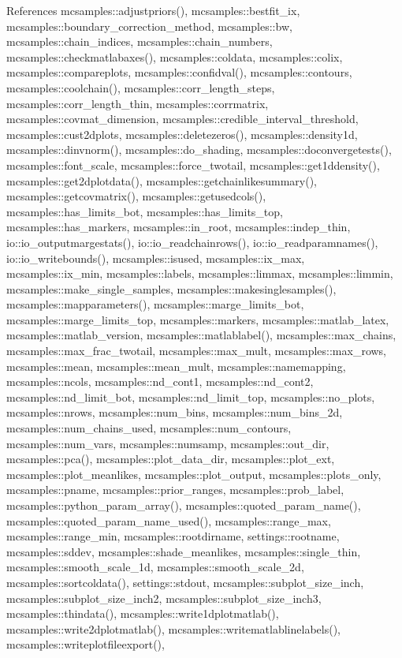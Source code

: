 References mcsamples\+::adjustpriors(), mcsamples\+::bestfit\+\_\+ix, mcsamples\+::boundary\+\_\+correction\+\_\+method, mcsamples\+::bw, mcsamples\+::chain\+\_\+indices, mcsamples\+::chain\+\_\+numbers, mcsamples\+::checkmatlabaxes(), mcsamples\+::coldata, mcsamples\+::colix, mcsamples\+::compareplots, mcsamples\+::confidval(), mcsamples\+::contours, mcsamples\+::coolchain(), mcsamples\+::corr\+\_\+length\+\_\+steps, mcsamples\+::corr\+\_\+length\+\_\+thin, mcsamples\+::corrmatrix, mcsamples\+::covmat\+\_\+dimension, mcsamples\+::credible\+\_\+interval\+\_\+threshold, mcsamples\+::cust2dplots, mcsamples\+::deletezeros(), mcsamples\+::density1d, mcsamples\+::dinvnorm(), mcsamples\+::do\+\_\+shading, mcsamples\+::doconvergetests(), mcsamples\+::font\+\_\+scale, mcsamples\+::force\+\_\+twotail, mcsamples\+::get1ddensity(), mcsamples\+::get2dplotdata(), mcsamples\+::getchainlikesummary(), mcsamples\+::getcovmatrix(), mcsamples\+::getusedcols(), mcsamples\+::has\+\_\+limits\+\_\+bot, mcsamples\+::has\+\_\+limits\+\_\+top, mcsamples\+::has\+\_\+markers, mcsamples\+::in\+\_\+root, mcsamples\+::indep\+\_\+thin, io\+::io\+\_\+outputmargestats(), io\+::io\+\_\+readchainrows(), io\+::io\+\_\+readparamnames(), io\+::io\+\_\+writebounds(), mcsamples\+::isused, mcsamples\+::ix\+\_\+max, mcsamples\+::ix\+\_\+min, mcsamples\+::labels, mcsamples\+::limmax, mcsamples\+::limmin, mcsamples\+::make\+\_\+single\+\_\+samples, mcsamples\+::makesinglesamples(), mcsamples\+::mapparameters(), mcsamples\+::marge\+\_\+limits\+\_\+bot, mcsamples\+::marge\+\_\+limits\+\_\+top, mcsamples\+::markers, mcsamples\+::matlab\+\_\+latex, mcsamples\+::matlab\+\_\+version, mcsamples\+::matlablabel(), mcsamples\+::max\+\_\+chains, mcsamples\+::max\+\_\+frac\+\_\+twotail, mcsamples\+::max\+\_\+mult, mcsamples\+::max\+\_\+rows, mcsamples\+::mean, mcsamples\+::mean\+\_\+mult, mcsamples\+::namemapping, mcsamples\+::ncols, mcsamples\+::nd\+\_\+cont1, mcsamples\+::nd\+\_\+cont2, mcsamples\+::nd\+\_\+limit\+\_\+bot, mcsamples\+::nd\+\_\+limit\+\_\+top, mcsamples\+::no\+\_\+plots, mcsamples\+::nrows, mcsamples\+::num\+\_\+bins, mcsamples\+::num\+\_\+bins\+\_\+2d, mcsamples\+::num\+\_\+chains\+\_\+used, mcsamples\+::num\+\_\+contours, mcsamples\+::num\+\_\+vars, mcsamples\+::numsamp, mcsamples\+::out\+\_\+dir, mcsamples\+::pca(), mcsamples\+::plot\+\_\+data\+\_\+dir, mcsamples\+::plot\+\_\+ext, mcsamples\+::plot\+\_\+meanlikes, mcsamples\+::plot\+\_\+output, mcsamples\+::plots\+\_\+only, mcsamples\+::pname, mcsamples\+::prior\+\_\+ranges, mcsamples\+::prob\+\_\+label, mcsamples\+::python\+\_\+param\+\_\+array(), mcsamples\+::quoted\+\_\+param\+\_\+name(), mcsamples\+::quoted\+\_\+param\+\_\+name\+\_\+used(), mcsamples\+::range\+\_\+max, mcsamples\+::range\+\_\+min, mcsamples\+::rootdirname, settings\+::rootname, mcsamples\+::sddev, mcsamples\+::shade\+\_\+meanlikes, mcsamples\+::single\+\_\+thin, mcsamples\+::smooth\+\_\+scale\+\_\+1d, mcsamples\+::smooth\+\_\+scale\+\_\+2d, mcsamples\+::sortcoldata(), settings\+::stdout, mcsamples\+::subplot\+\_\+size\+\_\+inch, mcsamples\+::subplot\+\_\+size\+\_\+inch2, mcsamples\+::subplot\+\_\+size\+\_\+inch3, mcsamples\+::thindata(), mcsamples\+::write1dplotmatlab(), mcsamples\+::write2dplotmatlab(), mcsamples\+::writematlablinelabels(), mcsamples\+::writeplotfileexport(), 